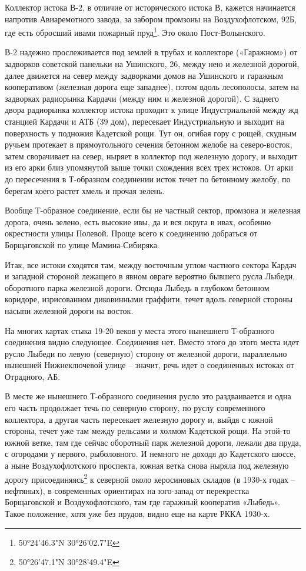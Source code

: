 Коллектор истока В-2, в отличие от исторического истока В, кажется начинается напротив Авиаремотного завода, за забором промзоны на Воздухофлотском, 92Б, где есть обросший ивами пожарный пруд\footnote{50°24'46.3"N 30°26'02.7"E}. Это около Пост-Волынского.

В-2 надежно прослеживается под землей в трубах и коллекторе («Гаражном») от задворков советской панельки на Ушинского, 26, между нею и железной дорогой, далее движется на север между задворками домов на Ушинского и гаражным кооперативом (железная дорога еще западнее), потом вдоль лесополосы, затем на задворках радиорынка Кардачи (между ним и железной дорогой). С заднего двора радиорынка коллектор истока проходит к улице Индустриальной между жд станцией Кардачи и АТБ (39 дом), пересекает Индустриальную и выходит на поверхность у подножия Кадетской рощи. Тут он, огибая гору с рощей, скудным ручьем протекает в прямоугольного сечения бетонном желобе на северо-восток, затем сворачивает на север, ныряет в коллектор под железную дорогу, и выходит из его арки близ упомянутой выше точки схождения всех трех истоков. От арки до пересечения в Т-образном соединении исток течет по бетонному желобу, по берегам коего растет хмель и прочая зелень.

Вообще Т-образное соединение, если бы не частный сектор, промзона и железная дорога, очень зелено, есть высокие ивы, да и вся округа в ивах, особенно окрестности улицы Полевой. Проще всего к соединению добраться от Борщаговской по улице Мамина-Сибиряка.

Итак, все истоки сходятся там, между восточным углом частного сектора Кардач и западной стороной лежащего в явном овраге вероятно бывшего русла Лыбеди, оборотного парка железной дороги. Отсюда Лыбедь в глубоком бетонном коридоре, изрисованном диковинными граффити, течет вдоль северной стороны насыпи  железной дороги на восток.

На многих картах стыка 19-20 веков у места этого нынешнего Т-образного соединения видно следующее. Соединения нет. Вместо этого до этого места идет русло Лыбеди по левую (северную) сторону от железной дороги, параллельно нынешней Нижнеключевой улице – значит, речь идет о соединенных истоках от Отрадного, АБ.

В месте же нынешнего Т-образного соединения русло это раздваивается и одна его часть продолжает течь по северную сторону, по руслу современного коллектора, а другая часть пересекает железную дорогу и, выйдя с южной стороны, течет уже там между рельсами и холмом Кадетской рощи. На этой-то южной ветке, там где сейчас оборотный парк железной дороги, лежали два пруда, с огородами у первого, рыболовного. И немного не доходя до Кадетского шоссе, а ныне Воздухофлотского проспекта, южная ветка снова ныряла под железную дорогу присоединяясь\footnote{50°26'47.1"N 30°28'49.4"E} к северной около керосиновых складов (в 1930-х годах – нефтяных), в современных ориентирах на юго-запад от перекрестка Борщаговской и Воздухофлотского, там где гаражный кооператив «Лыбедь». Такое положение, хотя уже без прудов, видно еще на карте РККА 1930-х.

